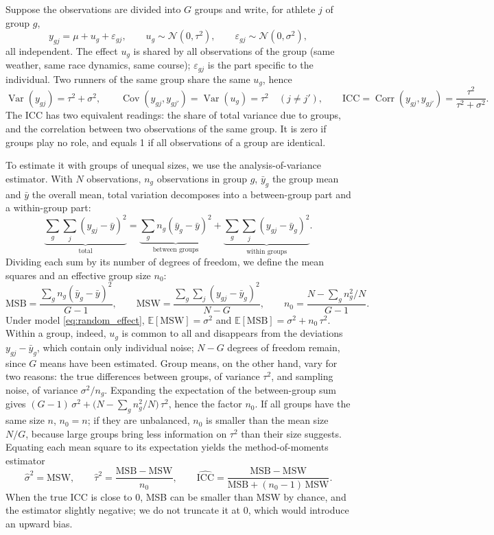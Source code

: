 \documentclass[11pt,a4paper]{article}
\newcommand{\E}{\mathbb{E}}
\DeclareMathOperator{\Var}{Var}
\DeclareMathOperator{\Cov}{Cov}
\DeclareMathOperator{\Corr}{Corr}
\begin{document}
Suppose the observations are divided into $G$ groups and write, for athlete $j$ of group $g$,
\begin{equation}\label{eq:random_effect}
y_{gj} = \mu + u_g + \varepsilon_{gj}, \qquad u_g \sim \mathcal{N}(0, \tau^2), \qquad
\varepsilon_{gj} \sim \mathcal{N}(0, \sigma^2),
\end{equation}
all independent. The effect $u_g$ is shared by all observations of the group (same weather, same race dynamics, same
course); $\varepsilon_{gj}$ is the part specific to the individual. Two runners of the same group share the same
$u_g$, hence
\[
\Var(y_{gj}) = \tau^2 + \sigma^2, \qquad \Cov(y_{gj}, y_{gj'}) = \Var(u_g) = \tau^2 \quad (j \neq j'), \qquad
\mathrm{ICC} = \Corr(y_{gj}, y_{gj'}) = \frac{\tau^2}{\tau^2 + \sigma^2} .
\]
The ICC has two equivalent readings: the share of total variance due to groups, and the correlation between two
observations of the same group. It is zero if groups play no role, and equals 1 if all observations of a group are
identical.

To estimate it with groups of unequal sizes, we use the analysis-of-variance estimator. With $N$ observations, $n_g$
observations in group $g$, $\bar y_g$ the group mean and $\bar y$ the overall mean, total variation decomposes into a
between-group part and a within-group part:
\[
\underbrace{\sum_g\sum_j(y_{gj}-\bar y)^2}_{\text{total}}
= \underbrace{\sum_g n_g(\bar y_g-\bar y)^2}_{\text{between groups}}
+ \underbrace{\sum_g\sum_j(y_{gj}-\bar y_g)^2}_{\text{within groups}} .
\]
Dividing each sum by its number of degrees of freedom, we define the mean squares and an effective group size $n_0$:
\[
\mathrm{MSB} = \frac{\sum_g n_g(\bar y_g - \bar y)^2}{G-1},\qquad
\mathrm{MSW} = \frac{\sum_g\sum_j (y_{gj} - \bar y_g)^2}{N-G},\qquad
n_0 = \frac{N - \sum_g n_g^2/N}{G-1} .
\]
Under model \eqref{eq:random_effect}, $\E[\mathrm{MSW}] = \sigma^2$ and $\E[\mathrm{MSB}] = \sigma^2 + n_0\,\tau^2$.
Within a group, indeed, $u_g$ is common to all and disappears from the deviations $y_{gj} - \bar y_g$, which contain only
individual noise; $N - G$ degrees of freedom remain, since $G$ means have been estimated. Group means, on the other
hand, vary for two reasons: the true differences between groups, of variance $\tau^2$, and sampling noise, of variance
$\sigma^2/n_g$. Expanding the expectation of the between-group sum gives
$(G - 1)\,\sigma^2 + \big(N - \sum_g n_g^2/N\big)\,\tau^2$, hence the factor $n_0$. If all groups have the same size
$n$, $n_0 = n$; if they are unbalanced, $n_0$ is smaller than the mean size $N/G$, because large groups bring less
information on $\tau^2$ than their size suggests. Equating each mean square to its expectation yields the
method-of-moments estimator
\[
\hat\sigma^2 = \mathrm{MSW}, \qquad \hat\tau^2 = \frac{\mathrm{MSB}-\mathrm{MSW}}{n_0}, \qquad
\widehat{\mathrm{ICC}} = \frac{\mathrm{MSB} - \mathrm{MSW}}{\mathrm{MSB} + (n_0 - 1)\,\mathrm{MSW}} .
\]
When the true ICC is close to 0, MSB can be smaller than MSW by chance, and the estimator slightly negative; we do not
truncate it at 0, which would introduce an upward bias.
\end{document}

